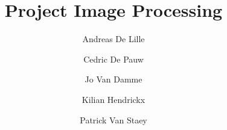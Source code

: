 \title{Project Image Processing}

\author{Andreas De Lille \and Cedric De Pauw \and Jo Van Damme  \and Kilian Hendrickx \and Patrick Van Staey}

\date{}

\maketitle              %
